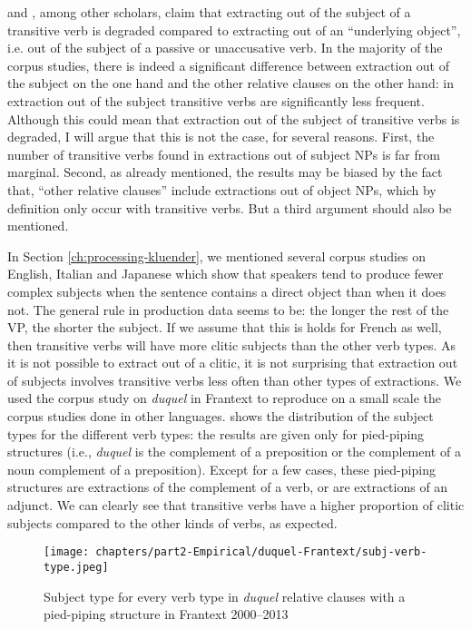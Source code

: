 \citet{Chomsky.2008} and \citet{Polinsky.2013}, among other scholars, claim that extracting out of the subject of a transitive verb is degraded compared to extracting out of an ``underlying object'', i.e. out of the subject of a passive or unaccusative verb. In the majority of the corpus studies, there is indeed a significant difference between extraction out of the subject on the one hand and the other relative clauses on the other hand: in extraction out of the subject transitive verbs are significantly less frequent. Although this could mean that extraction out of the subject of transitive verbs is degraded, I will argue that this is not the case, for several reasons. First, the number of transitive verbs found in extractions out of subject NPs is far from marginal. Second, as already mentioned, the results may be biased by the fact that, ``other relative clauses'' include extractions out of object NPs, which by definition only occur with transitive verbs. But a third argument should also be mentioned.

In Section \ref{ch:processing-kluender}, we mentioned several corpus studies on English, Italian and Japanese which show that speakers tend to produce fewer complex subjects when the sentence contains a direct object than when it does not. 
The general rule in production data seems to be: the longer the rest of the VP, the shorter the subject.
If we assume that this is holds for French as well, then transitive verbs will have more clitic subjects than the other verb types. 
As it is not possible to extract out of a clitic, it is not surprising that extraction out of subjects involves transitive verbs less often than other types of extractions. We used the corpus study on \emph{duquel} in Frantext to reproduce on a small scale the corpus studies done in other languages. 
 shows the distribution of the subject types for the different verb types: the results are given only for pied-piping structures (i.e., \emph{duquel} is the complement of a preposition or the complement of a noun complement of a preposition). Except for a few cases, these pied-piping structures are extractions of the complement of a verb, or are extractions of an adjunct. We can clearly see that transitive verbs have a higher proportion of clitic subjects compared to the other kinds of verbs, as expected.

\begin{figure}
        \centering
        \texttt{[image: chapters/part2-Empirical/duquel-Frantext/subj-verb-type.jpeg]}
        \caption{Subject type for every verb type in \emph{duquel} relative clauses with a pied-piping structure in Frantext 2000--2013}
        \label{fig:duq-diversesubjtype-verbtype}
\end{figure}


